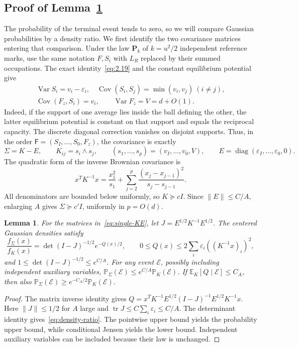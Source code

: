 \documentclass[11pt,a4paper]{article}
\numberwithin{equation}{section}
\newtheorem{lemma}[theorem]{Lemma}
\theoremstyle{remark}
\DeclareMathOperator{\Var}{Var}
\DeclareMathOperator{\Cov}{Cov}
\DeclareMathOperator{\diag}{diag}
\begin{document}
\subsection{Proof of Lemma~\ref{lem:gaussian-density}}\label{sec:covariance}
The probability of the terminal event tends to zero, so we will compare Gaussian probabilities by a density ratio. We first identify the two covariance matrices entering that comparison.
Under the law $\mathbf P_k$ of $k=u^2/2$ independent reference marks, use
the same notation $F,S_i$ with $L_R$ replaced by their summed occupations.
The exact identity~\eqref{eq:2.19} and the constant equilibrium potential give
\begin{equation}\label{eq:single-covariance}
\begin{gathered}
\Var S_i=v_i-\varepsilon_i,\quad
\Cov(S_i,S_j)=\min(v_i,v_j)\ (i\ne j),\\
\Cov(F_z,S_i)=v_i,\qquad \Var F_z=V=d+O(1).
\end{gathered}
\end{equation}
Indeed, if the support of one average lies inside the ball defining the other, the latter equilibrium potential is constant on that support and equals the reciprocal capacity. The discrete diagonal correction vanishes on disjoint supports. Thus, in the order
$\mathsf F=(S_I,\ldots,S_0,F_z)$, the covariance is exactly
\begin{equation}\label{eq:single-KE}
\Sigma=K-E,\qquad K_{ij}=s_i\wedge s_j,\qquad
(s_1,\ldots,s_p)=(v_I,\ldots,v_0,V),\qquad
E=\diag(\varepsilon_I,\ldots,\varepsilon_0,0).
\end{equation}
The quadratic form of the inverse Brownian covariance is
\[
x^TK^{-1}x=\frac{x_1^2}{s_1}
+\sum_{j=2}^p\frac{(x_j-x_{j-1})^2}{s_j-s_{j-1}}.
\]
All denominators are bounded below uniformly, so $K\succeq cI$. Since
$\|E\|\le C/A$, enlarging $A$ gives $\Sigma\succeq c'I$, uniformly in $p=O(d)$.

\begin{lemma}\label{lem:gaussian-density}
For the matrices in~\eqref{eq:single-KE}, let
$J=E^{1/2}K^{-1}E^{1/2}$. The centered Gaussian densities satisfy
\begin{equation}\label{eq:density-ratio}
\frac{f_\Sigma(x)}{f_K(x)}=\det(I-J)^{-1/2}e^{-Q(x)/2},\qquad
0\le Q(x)\le2\sum_i\varepsilon_i((K^{-1}x)_i)^2,
\end{equation}
and $1\le\det(I-J)^{-1/2}\le e^{C/A}$.
For any event $\mathcal E$, possibly including independent auxiliary variables,
$\mathbb P_\Sigma(\mathcal E)\le e^{C/A}\mathbb P_K(\mathcal E)$.
If $\mathbb E_K[Q\mid\mathcal E]\le C_A$, then also
$\mathbb P_\Sigma(\mathcal E)\ge e^{-C_A/2}\mathbb P_K(\mathcal E)$.
\end{lemma}
\begin{proof}
The matrix inverse identity gives
$Q=x^TK^{-1}E^{1/2}(I-J)^{-1}E^{1/2}K^{-1}x$.
Here $\|J\|\le1/2$ for $A$ large and
$\operatorname{tr}J\le C\sum_i\varepsilon_i\le C/A$.
The determinant identity gives~\eqref{eq:density-ratio}. The pointwise upper bound yields the probability upper bound, while conditional Jensen yields the lower bound. Independent auxiliary variables can be included because their law is unchanged.
\end{proof}
\end{document}
